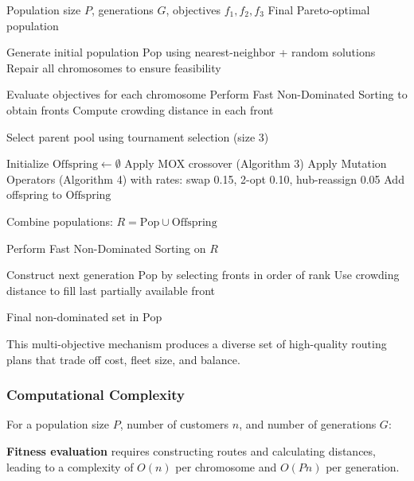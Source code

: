 \documentclass[conference]{IEEEtran}
\begin{document}
\begin{algorithm}[htbp]
\caption{NSGA-II Integrated Genetic Algorithm for MDVRP}
\begin{algorithmic}[1]
\REQUIRE Population size $P$, generations $G$, objectives $f_1,f_2,f_3$
\ENSURE Final Pareto-optimal population

\STATE Generate initial population $\text{Pop}$ using nearest-neighbor + random solutions
\STATE Repair all chromosomes to ensure feasibility


    \STATE Evaluate objectives for each chromosome
    \STATE Perform Fast Non-Dominated Sorting to obtain fronts
    \STATE Compute crowding distance in each front

    \STATE Select parent pool using tournament selection (size 3)

    \STATE Initialize $\text{Offspring} \leftarrow \emptyset$
            \STATE Apply MOX crossover (Algorithm 3)
        \ENDIF
        \STATE Apply Mutation Operators (Algorithm 4) with rates: swap 0.15, 2-opt 0.10, hub-reassign 0.05
        \STATE Add offspring to $\text{Offspring}$
    \ENDFOR

    \STATE Combine populations: $R = \text{Pop} \cup \text{Offspring}$

    \STATE Perform Fast Non-Dominated Sorting on $R$

    \STATE Construct next generation $\text{Pop}$ by selecting fronts in order of rank
    \STATE Use crowding distance to fill last partially available front

\ENDFOR

\RETURN Final non-dominated set in $\text{Pop}$
\end{algorithmic}
\end{algorithm}

This multi-objective mechanism produces a diverse set of high-quality routing plans that trade off cost, fleet size, and balance.

\subsubsection{Computational Complexity}

For a population size $P$, number of customers $n$, and number of generations $G$:

\textbf{Fitness evaluation} requires constructing routes and calculating distances, leading to a complexity of $O(n)$ per chromosome and $O(Pn)$ per generation.
\end{document}
